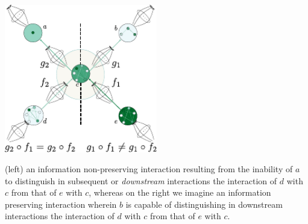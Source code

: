 \begin{frame}
\centering\includegraphics[width=0.5\textwidth]{fig/infopres.pdf}

(left) an information non-preserving interaction resulting from the inability of $a$ to distinguish in subsequent or {\it downstream} interactions the interaction of $d$  with $c$ from that of $e$ with $c$, whereas on the right we imagine an information preserving interaction wherein $b$ is capable of distinguishing in downstream interactions the interaction of $d$  with $c$ from that of $e$ with $c$.
\end{frame}